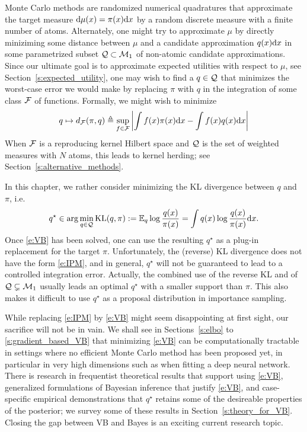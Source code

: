 
Monte Carlo methods are randomized numerical quadratures that approximate the target measure $\mathrm{d}\mu(x) = \pi(x)\mathrm{d} x$ by a random discrete measure with a finite number of atoms. 
Alternately, one might try to approximate $\mu$ by directly miniziming some distance between $\mu$ and a candidate approximation $q(x)\mathrm{d} x$ in some parametrized subset $\mathcal{Q}\subset \mathcal{M}_1$ of non-atomic candidate approximations. 
Since our ultimate goal is to approximate expected utilities with respect to $\mu$, see Section~\ref{s:expected_utility}, one may wish to find a $q\in\mathcal{Q}$ that minimizes the worst-case error we would make by replacing $\pi$ with $q$ in the integration of some class $\mathcal{F}$ of functions.
Formally, we might wish to minimize
\begin{equation}
  \label{e:IPM}
  q\mapsto d_{\mathcal{F}}(\pi, q) \triangleq \sup_{f\in\mathcal{F}} \left\vert \int f(x)\pi(x)\mathrm{d} x - \int f(x)q(x)\mathrm{d} x \right\vert
\end{equation}
When $\mathcal{F}$ is a reproducing kernel Hilbert space and $\mathcal{Q}$ is the set of weighted measures with $N$ atoms, this leads to kernel herding; see Section~\ref{s:alternative_methods}. 

In this chapter, we rather consider minimizing the KL divergence between $q$ and $\pi$, i.e.
\begin{equation}
  q^\star \in \arg\min_{q\in\mathcal Q} \text{KL}(q, \pi) := \mathbb E_q \log \frac{q(x)}{\pi(x)} = \int q(x) \log \frac{q(x)}{\pi(x)} \mathrm{d} x.
\label{e:VB}
\end{equation}
Once \eqref{e:VB} has been solved, one can use the resulting $q^\star$ as a plug-in replacement for the target $\pi$.
Unfortunately, the (reverse) KL divergence does not have the form \eqref{e:IPM}, and in general, $q^\star$ will not be guaranteed to lead to a controlled integration error. 
Actually, the combined use of the reverse KL and of $\mathcal{Q} \subsetneq \mathcal{M}_1$ usually leads an optimal $q^\star$ with a smaller support than $\pi$.
This also makes it difficult to use $q^\star$ as a proposal distribution in importance sampling.

While replacing \eqref{e:IPM} by \eqref{e:VB} might seem disappointing at first sight, our sacrifice will not be in vain. 
We shall see in Sections~\ref{s:elbo} to \ref{s:gradient_based_VB} that minimizing \eqref{e:VB} can be computationally tractable in settings where no efficient Monte Carlo method has been proposed yet, in particular in very high dimensions such as when fitting a deep neural network. 
There is research in frequentist theoretical results that support using \eqref{e:VB}, generalized formulations of Bayesian inference that justify \eqref{e:VB}, and case-specific empirical demonstrations that $q^\star$ retains some of the desireable properties of the posterior; we survey some of these results in Section~\ref{s:theory_for_VB}.
Closing the gap between VB and Bayes is an exciting current research topic.

